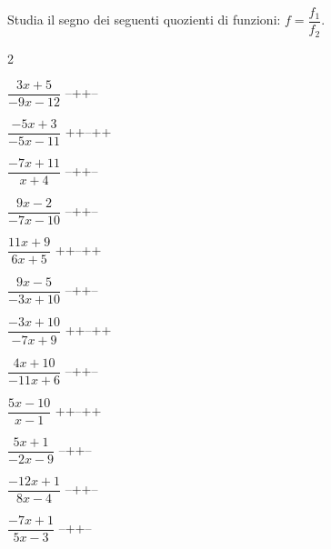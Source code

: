 \begin{esercizio}\label{ese:dis_8}
Studia il segno dei seguenti quozienti di funzioni: 
\(f = \dfrac {f_1}{f_2}\).
\begin{htmulticols}{2}
\begin{enumeratea}
\item  \(\dfrac{3 x +5}{-9 x -12}\) \sol 
{--++--}
\item  \(\dfrac{-5 x +3}{-5 x -11}\) \sol 
{++--++}
\item  \(\dfrac{-7 x +11}{x +4}\) \sol 
{--++--}
\item  \(\dfrac{9 x -2}{-7 x -10}\) \sol 
{--++--}
\item  \(\dfrac{11 x +9}{6 x +5}\) \sol 
{++--++}
\item  \(\dfrac{9 x -5}{-3 x +10}\) \sol 
{--++--}
\item  \(\dfrac{-3 x +10}{-7 x +9}\) \sol 
{++--++}
\item  \(\dfrac{4 x +10}{-11 x +6}\) \sol 
{--++--}
\item  \(\dfrac{5 x -10}{x -1}\) \sol 
{++--++}
\item  \(\dfrac{5 x +1}{-2 x -9}\) \sol 
{--++--}
\item  \(\dfrac{-12 x +1}{8 x -4}\) \sol 
{--++--}
\item  \(\dfrac{-7 x +1}{5 x -3}\) \sol 
{--++--}
\end{enumeratea}
\end{htmulticols}
\end{esercizio}

\subsubsection*{}

